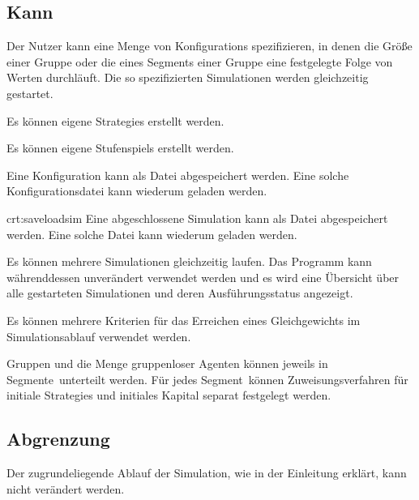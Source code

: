 \documentclass[parskip=full,11pt]{scrartcl}
\def\segment{Segment}
\def\segments{Segmente}
\begin{document}
\subsection{Kann}

Der \Gls{Nutzer} kann eine Menge von \Glspl{Konfiguration} spezifizieren, in denen die Größe einer Gruppe oder die eines \segment s einer Gruppe eine festgelegte Folge von Werten durchläuft. Die so spezifizierten Simulationen werden gleichzeitig gestartet.

Es können eigene \Glspl{Strategie} erstellt werden.

Es können eigene \Glspl{Stufenspiel} erstellt werden.

Eine \Gls{Konfiguration} kann als Datei abgespeichert werden. Eine solche Konfigurationsdatei kann wiederum geladen werden.

{crt:saveloadsim}
Eine abgeschlossene Simulation kann als Datei abgespeichert werden. Eine solche Datei kann wiederum geladen werden.

Es können mehrere Simulationen gleichzeitig laufen. Das Programm kann währenddessen unverändert verwendet werden und es wird eine Übersicht über alle gestarteten Simulationen und deren Ausführungsstatus angezeigt.

Es können mehrere Kriterien für das Erreichen eines \Gls{Gleichgewicht}s im Simulationsablauf verwendet werden.

Gruppen und die Menge \gls{gruppenloser Agent}en können jeweils in \segments\ unterteilt werden. Für jedes \segment\ können Zuweisungsverfahren für initiale \Glspl{Strategie} und initiales \Gls{Kapital} separat festgelegt werden.

\subsection{Abgrenzung}

Der zugrundeliegende Ablauf der Simulation, wie in der Einleitung erklärt, kann nicht verändert werden.
\end{document}
